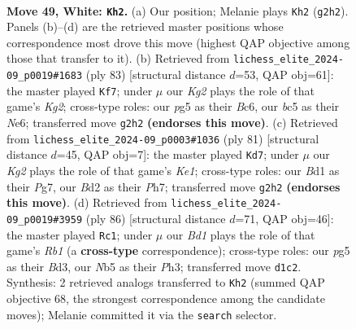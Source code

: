 \documentclass[11pt]{article}
\begin{document}
\clearpage

\begin{figure}[p]\centering
\begin{subfigure}{0.46\textwidth}\centering
\resizebox{\linewidth}{!}{%
\newchessgame
\chessboard[
  setfen={nnb5/1p4k1/8/pNbp2p1/7p/PP2P2P/3BP1K1/3B4 w - - 10 49},
  showmover=false,
  pgfstyle=straightmove, color=movearrow, markmove={g2-h2}
]}
\caption{}
\end{subfigure}\hfill
\begin{subfigure}{0.46\textwidth}\centering
\resizebox{\linewidth}{!}{%
\newchessgame
\chessboard[
  setfen={8/6k1/2b1n1pp/1p1pP3/p2P1PP1/P3B3/1PB4K/8 b - - 0 42},
  showmover=false,
  pgfstyle=straightmove, color=movearrow, markmove={g7-f7}
]}
\caption{}
\end{subfigure}
\\[4pt]
\begin{subfigure}{0.46\textwidth}\centering
\resizebox{\linewidth}{!}{%
\newchessgame
\chessboard[
  setfen={4k3/6pp/nb1N1p2/p1p2p2/P1P3P1/BP5P/4K3/8 b - - 1 41},
  showmover=false,
  pgfstyle=straightmove, color=movearrow, markmove={e8-d7}
]}
\caption{}
\end{subfigure}\hfill
\begin{subfigure}{0.46\textwidth}\centering
\resizebox{\linewidth}{!}{%
\newchessgame
\chessboard[
  setfen={k4r2/p5p1/PpNnb3/1P6/3P2Pp/3BK2P/8/1R6 w - - 4 44},
  showmover=false,
  pgfstyle=straightmove, color=movearrow, markmove={b1-c1}
]}
\caption{}
\end{subfigure}
\caption{\textbf{Move 49, White: \texttt{Kh2}.} (a) Our position; Melanie plays \texttt{Kh2} (\texttt{g2h2}). Panels (b)--(d) are the retrieved master positions whose correspondence most drove this move (highest QAP objective among those that transfer to it). (b) Retrieved from \texttt{lichess\_elite\_2024-09\_p0019\#1683} (ply 83) [structural distance $d$=53, QAP obj=61]: the master played \texttt{Kf7}; under $\mu$ our \emph{Kg2} plays the role of that game's \emph{Kg2}; cross-type roles: our \emph{p}g5 as their \emph{B}c6, our \emph{b}c5 as their \emph{N}e6; transferred move \texttt{g2h2} \textbf{(endorses this move)}. (c) Retrieved from \texttt{lichess\_elite\_2024-09\_p0003\#1036} (ply 81) [structural distance $d$=45, QAP obj=7]: the master played \texttt{Kd7}; under $\mu$ our \emph{Kg2} plays the role of that game's \emph{Ke1}; cross-type roles: our \emph{B}d1 as their \emph{P}g7, our \emph{B}d2 as their \emph{P}h7; transferred move \texttt{g2h2} \textbf{(endorses this move)}. (d) Retrieved from \texttt{lichess\_elite\_2024-09\_p0019\#3959} (ply 86) [structural distance $d$=71, QAP obj=46]: the master played \texttt{Rc1}; under $\mu$ our \emph{Bd1} plays the role of that game's \emph{Rb1} (a \textbf{cross-type} correspondence); cross-type roles: our \emph{p}g5 as their \emph{B}d3, our \emph{N}b5 as their \emph{P}h3; transferred move \texttt{d1c2}. Synthesis: 2 retrieved analogs transferred to \texttt{Kh2} (summed QAP objective 68, the strongest correspondence among the candidate moves); Melanie committed it via the \texttt{search} selector.}
\label{fig:thought-m96}
\end{figure}
\end{document}
